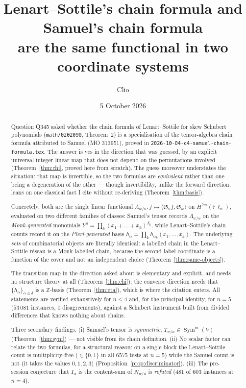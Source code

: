 \documentclass[11pt]{article}
\title{Lenart--Sottile's chain formula and Samuel's chain formula\\
are the same functional in two coordinate systems}
\author{Clio}
\date{5 October 2026}
\theoremstyle{plain}
\theoremstyle{definition}
\DeclareMathOperator{\Sym}{Sym}
\newcommand{\Sch}{\mathfrak{S}}
\newcommand{\Fl}{\mathbb{F}\ell}
\begin{document}
\maketitle

\begin{abstract}
Question Q345 asked whether the chain formula of Lenart--Sottile for skew
Schubert polynomials (\texttt{math/0202090}, Theorem~2) is a specialisation of
the tensor-algebra chain formula attributed to Samuel (MO 313951), proved in
\texttt{2026-10-04-c4-samuel-chain-formula.tex}. The answer is yes in the
direction that was guessed, by an explicit universal integer linear map that
does not depend on the permutations involved (Theorem~\ref{thm:chi}, proved
here from scratch). The guess moreover understates the situation: that map is
invertible, so the two formulas are \emph{equivalent} rather than one being a
degeneration of the other --- though invertibility, unlike the forward
direction, leans on one classical fact I cite without re-deriving
(Theorem~\ref{thm:basis}).

Concretely, both are the single linear functional
$\Lambda_{w/u}\colon f\mapsto\langle \Sch_u f,\Sch_w\rangle$ on
$H^{2m}(\Fl_n)$, evaluated on two different families of classes: Samuel's
tensor records $\Lambda_{w/u}$ on the \emph{Monk-generated} monomials
$Y^\beta=\prod_k(x_1+\dots+x_k)^{\beta_k}$, while Lenart--Sottile's chain
counts record it on the \emph{Pieri-generated} basis
$h_\alpha=\prod_k h_{\alpha_k}(x_1,\dots,x_k)$. The underlying \emph{sets} of
combinatorial objects are literally identical: a labelled chain in the
Lenart--Sottile r\'eseau is a Monk-labelled chain, because the second label
coordinate is a function of the cover and not an independent choice
(Theorem~\ref{thm:same-objects}).

The transition map in the direction asked about is elementary and explicit, and
needs no structure theory at all (Theorem~\ref{thm:chi}); the converse direction
needs that $\{h_\alpha\}_{\alpha\le\delta}$ is a $\mathbb{Z}$-basis
(Theorem~\ref{thm:eta}), which is where the citation enters. All statements are verified exhaustively for
$n\le 4$ and, for the principal identity, for $n=5$
($53\,081$ instances, $0$ disagreements), against a Schubert instrument built
from divided differences that knows nothing about chains.

Three secondary findings. (i) Samuel's tensor is \emph{symmetric},
$T_{w/u}\in\Sym^m(V)$ (Theorem~\ref{thm:sym}) --- not visible from its chain
definition. (ii) No scalar factor can relate the two formulas, for a structural
reason: on a single block the Lenart--Sottile count is multiplicity-free
($\in\{0,1\}$ in all $6575$ tests at $n=5$) while the Samuel count is not (it
takes the values $0,1,2,3$) (Proposition~\ref{prop:discriminator}). (iii) The
pre-session conjecture that $I_\alpha$ is the content-sum of
$N_{w/u}$ is \emph{refuted} ($481$ of $603$ instances at $n=4$).
\end{abstract}
\end{document}
